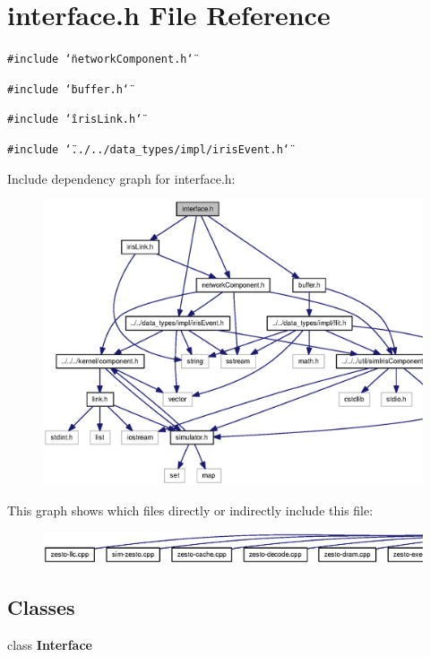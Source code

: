 \section{interface.h File Reference}
\label{interface_8h}
{\tt \#include \char`\"{}networkComponent.h\char`\"{}}\par
{\tt \#include \char`\"{}buffer.h\char`\"{}}\par
{\tt \#include \char`\"{}irisLink.h\char`\"{}}\par
{\tt \#include \char`\"{}../../data\_\-types/impl/irisEvent.h\char`\"{}}\par


Include dependency graph for interface.h:\nopagebreak
\begin{figure}[H]
\begin{center}
\leavevmode
\includegraphics[width=339pt]{interface_8h__incl}
\end{center}
\end{figure}


This graph shows which files directly or indirectly include this file:\nopagebreak
\begin{figure}[H]
\begin{center}
\leavevmode
\includegraphics[width=420pt]{interface_8h__dep__incl}
\end{center}
\end{figure}
\subsection*{Classes}
\begin{CompactItemize}
\item 
class {\bf Interface}
\end{CompactItemize}
